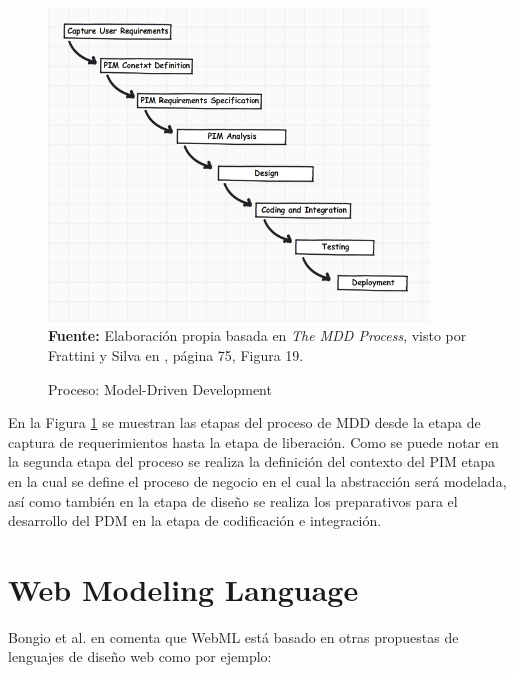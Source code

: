 \documentclass[oneside,12pt,a4paper]{memoir}%
\begin{document}
	\begin{figure}[here]
		\centering
		\caption{Proceso: Model-Driven Development}
		\includegraphics[width=0.9\textwidth]{figure/fig_MDDProcess.png}
			\newline
			\textbf{Fuente:} Elaboraci\'on propia basada en \textit{The MDD
			Process}, visto por Frattini y Silva en \cite{Frattini2007}, p\'agina 75,
			Figura 19.
		\label{fig:MDDProcess}
	\end{figure}
	 
	En la Figura \ref{fig:MDDProcess} se muestran las etapas del proceso de
	\ac{MDD} desde la etapa de captura de requerimientos
	hasta la etapa de liberaci\'on. Como se puede notar en la segunda etapa del
	proceso se realiza la definici\'on del contexto del \ac{PIM} etapa en la cual se
	define el proceso de negocio en el cual la abstracci\'on ser\'a modelada, as\'i como
	tambi\'en en la etapa de dise\~no se realiza los preparativos para el desarrollo
	del \ac{PDM} en la etapa de codificaci\'on e integraci\'on.
	
	\section{Web Modeling Language}
	\label{sec:WebML}
	
	
	Bongio et al. en \cite{Ceri2000} comenta que \ac{WebML} est\'a basado en
	otras propuestas de lenguajes de dise\~no web como por ejemplo:
	
\end{document}
